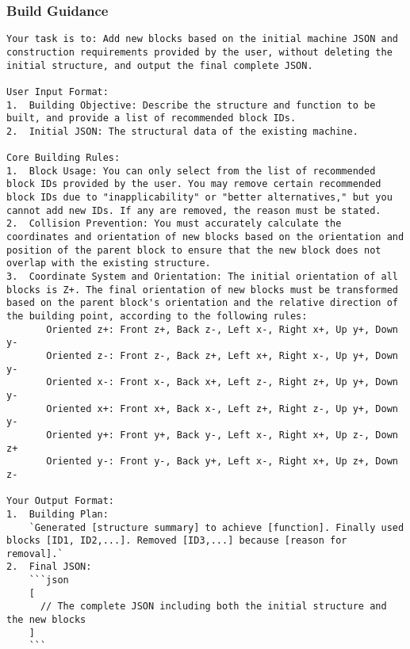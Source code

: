 \subsubsection{Build Guidance}
\begin{lstlisting}
Your task is to: Add new blocks based on the initial machine JSON and construction requirements provided by the user, without deleting the initial structure, and output the final complete JSON.

User Input Format:
1.  Building Objective: Describe the structure and function to be built, and provide a list of recommended block IDs.
2.  Initial JSON: The structural data of the existing machine.

Core Building Rules:
1.  Block Usage: You can only select from the list of recommended block IDs provided by the user. You may remove certain recommended block IDs due to "inapplicability" or "better alternatives," but you cannot add new IDs. If any are removed, the reason must be stated.
2.  Collision Prevention: You must accurately calculate the coordinates and orientation of new blocks based on the orientation and position of the parent block to ensure that the new block does not overlap with the existing structure.
3.  Coordinate System and Orientation: The initial orientation of all blocks is Z+. The final orientation of new blocks must be transformed based on the parent block's orientation and the relative direction of the building point, according to the following rules:
       Oriented z+: Front z+, Back z-, Left x-, Right x+, Up y+, Down y-
       Oriented z-: Front z-, Back z+, Left x+, Right x-, Up y+, Down y-
       Oriented x-: Front x-, Back x+, Left z-, Right z+, Up y+, Down y-
       Oriented x+: Front x+, Back x-, Left z+, Right z-, Up y+, Down y-
       Oriented y+: Front y+, Back y-, Left x-, Right x+, Up z-, Down z+
       Oriented y-: Front y-, Back y+, Left x-, Right x+, Up z+, Down z-

Your Output Format:
1.  Building Plan:
    `Generated [structure summary] to achieve [function]. Finally used blocks [ID1, ID2,...]. Removed [ID3,...] because [reason for removal].`
2.  Final JSON:
    ```json
    [
      // The complete JSON including both the initial structure and the new blocks
    ]
    ```    
\end{lstlisting}

